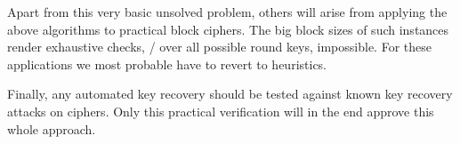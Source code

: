 Apart from this very basic unsolved problem, others will arise from applying the above algorithms to practical block ciphers.
The big block sizes of such instances render exhaustive checks, \eg/ over all possible round keys, impossible.
For these applications we most probable have to revert to heuristics.

Finally, any automated key recovery should be tested against known key recovery attacks on ciphers.
Only this practical verification will in the end approve this whole approach.

